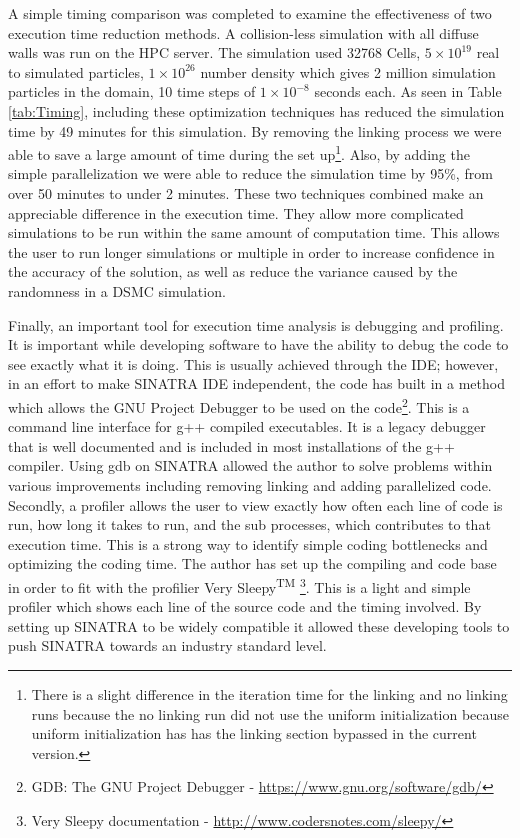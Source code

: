 \indent A simple timing comparison was completed to examine the effectiveness of two execution time reduction methods. A collision-less simulation with all diffuse walls was run on the HPC server. The simulation used 32768 Cells, \(5 \times 10^{19}\) real to simulated particles, \(1 \times 10^{26}\) number density which gives 2 million simulation particles in the domain, 10 time steps of \(1 \times 10^{-8}\) seconds each. As seen in Table \ref{tab:Timing}, including these optimization techniques has reduced the simulation time by 49 minutes for this simulation. By removing the linking process we were able to save a large amount of time during the set up\footnote{There is a slight difference in the iteration time for the linking and no linking runs because the no linking run did not use the uniform initialization because uniform initialization has has the linking section bypassed in the current version.}. Also, by adding the simple parallelization we were able to reduce the simulation time by 95\%, from over 50 minutes to under 2 minutes. These two techniques combined make an appreciable difference in the execution time. They allow more complicated simulations to be run within the same amount of computation time. This allows the user to run longer simulations or multiple in order to increase confidence in the accuracy of the solution, as well as reduce the variance caused by the randomness in a DSMC simulation. \par

\indent Finally, an important tool for execution time analysis is debugging and profiling. It is important while developing software to have the ability to debug the code to see exactly what it is doing. This is usually achieved through the IDE; however, in an effort to make SINATRA IDE independent, the code has built in a method which allows the GNU Project Debugger to be used on the code\footnote{GDB: The GNU Project Debugger - \url{https://www.gnu.org/software/gdb/}}. This is a command line interface for g++ compiled executables. It is a legacy debugger that is well documented and is included in most installations of the g++ compiler. Using gdb on SINATRA allowed the author to solve problems within various improvements including removing linking and adding parallelized code. Secondly, a profiler allows the user to view exactly how often each line of code is run, how long it takes to run, and the sub processes, which contributes to that execution time. This is a strong way to identify simple coding bottlenecks and optimizing the coding time. The author has set up the compiling and code base in order to fit with the profilier Very Sleepy\textsuperscript{TM} \footnote{Very Sleepy documentation - \url{http://www.codersnotes.com/sleepy/}}. This is a light and simple profiler which shows each line of the source code and the timing involved. By setting up SINATRA to be widely compatible it allowed these developing tools to push SINATRA towards an industry standard level. \par



